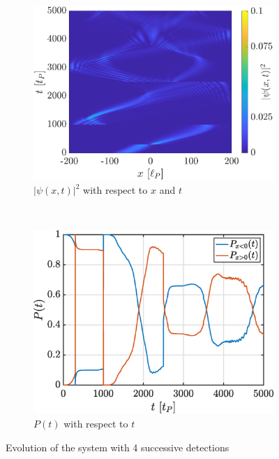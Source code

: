 \documentclass[a4paper,12pt,twoside]{article}
\begin{document}
    \begin{figure}[h]
        \centering
        \begin{subfigure}[t]{0.45\textwidth}
          \includegraphics[width=\textwidth]{graphs/bonus2_evo.eps}
          \caption{$|\psi(x, t)|^2$ with respect to $x$ and $t$}
          \label{fig:bonus2_evo}
        \end{subfigure}
        ~
        \begin{subfigure}[t]{0.45\textwidth}
          \includegraphics[width=\textwidth]{graphs/bonus2_prob.eps}
          \caption{$P(t)$ with respect to $t$}
          \label{fig:bonus2_prob}
        \end{subfigure}
        \caption{Evolution of the system with 4 successive detections}
        \label{fig:bonus2}
      \end{figure}
      
\end{document}
